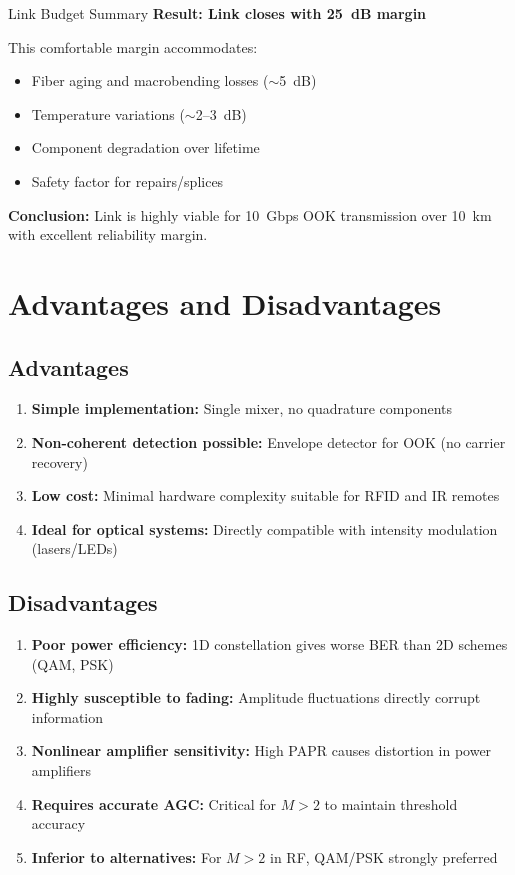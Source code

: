 \begin{calloutbox}[colback=black!8!white,colframe=black]{Link Budget Summary}
\textbf{Result: Link closes with 25~dB margin}

This comfortable margin accommodates:
\begin{itemize}
\item Fiber aging and macrobending losses ($\sim$5~dB)
\item Temperature variations ($\sim$2--3~dB)
\item Component degradation over lifetime
\item Safety factor for repairs/splices
\end{itemize}

\textbf{Conclusion:} Link is highly viable for 10~Gbps OOK transmission over 10~km with excellent reliability margin.
\end{calloutbox}

\section{Advantages and Disadvantages}

\subsection*{Advantages}

\begin{enumerate}
\item \textbf{Simple implementation:} Single mixer, no quadrature components
\item \textbf{Non-coherent detection possible:} Envelope detector for OOK (no carrier recovery)
\item \textbf{Low cost:} Minimal hardware complexity suitable for RFID and IR remotes
\item \textbf{Ideal for optical systems:} Directly compatible with intensity modulation (lasers/LEDs)
\end{enumerate}

\subsection*{Disadvantages}

\begin{enumerate}
\item \textbf{Poor power efficiency:} 1D constellation gives worse BER than 2D schemes (QAM, PSK)
\item \textbf{Highly susceptible to fading:} Amplitude fluctuations directly corrupt information
\item \textbf{Nonlinear amplifier sensitivity:} High PAPR causes distortion in power amplifiers
\item \textbf{Requires accurate AGC:} Critical for $M > 2$ to maintain threshold accuracy
\item \textbf{Inferior to alternatives:} For $M > 2$ in RF, QAM/PSK strongly preferred
\end{enumerate}

